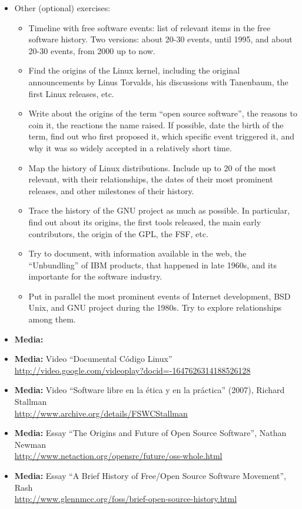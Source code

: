 \documentclass[a4paper]{article}
\begin{document}
\begin{itemize}
\item Other (optional) exercises:
  \begin{itemize}
  \item Timeline with free software events: list of relevant items in the free software history. Two versions: about 20-30 events, until 1995, and about 20-30 events, from 2000 up to now.
  \item Find the origins of the Linux kernel, including the original announcements by Linus Torvalds, his discussions with Tanenbaum, the first Linux releases, etc.
  \item Write about the origins of the term ``open source software'', the reasons to coin it, the reactions the name raised. If possible, date the birth of the term, find out who first proposed it, which specific event triggered it, and why it was so widely accepted in a relatively short time.
  \item Map the history of Linux distributions. Include up to 20 of the most relevant, with their relationships, the dates of their most prominent releases, and other milestones of their history.
  \item Trace the history of the GNU project as much as possible. In particular, find out about its origins, the first tools released, the main early contributors, the origin of the GPL, the FSF, etc.
  \item Try to document, with information available in the web, the ``Unbundling'' of IBM products, that happened in late 1960s, and its importante for the software industry.
  \item Put in parallel the most prominent events of Internet development, BSD Unix, and GNU project during the 1980s. Try to explore relationships among them.
  \end{itemize}

\item \textbf{Media:}
\item \textbf{Media:} Video ``Documental Código Linux'' \\
  \url{http://video.google.com/videoplay?docid=-1647626314188526128}

\item \textbf{Media:} Video ``Software libre en la ética y en la práctica'' (2007), Richard Stallman \\
  \url{http://www.archive.org/details/FSWCStallman}
\item \textbf{Media:} Essay ``The Origins and Future of Open Source Software'', Nathan Newman \\
  \url{http://www.netaction.org/opensrc/future/oss-whole.html}
\item \textbf{Media:} Essay ``A Brief History of Free/Open Source Software Movement'', Rash \\
  \url{http://www.glennmcc.org/foss/brief-open-source-history.html}

\end{itemize}
\end{document}
